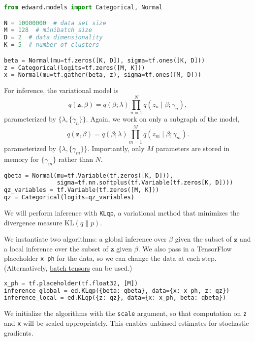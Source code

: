 \begin{lstlisting}[language=Python]
from edward.models import Categorical, Normal

N = 10000000  # data set size
M = 128  # minibatch size
D = 2  # data dimensionality
K = 5  # number of clusters

beta = Normal(mu=tf.zeros([K, D]), sigma=tf.ones([K, D]))
z = Categorical(logits=tf.zeros([M, K]))
x = Normal(mu=tf.gather(beta, z), sigma=tf.ones([M, D]))
\end{lstlisting}

For inference, the variational model is
\begin{equation*}
q(\mathbf{z}, \beta) =
q(\beta; \lambda) \prod_{n=1}^N q(z_n \mid \beta; \gamma_n),
\end{equation*}
parameterized by $\{\lambda, \{\gamma_n\}\}$.
Again, we work on only a subgraph of the model,
\begin{equation*}
q(\mathbf{z}, \beta) =
q(\beta; \lambda) \prod_{m=1}^M q(z_m \mid \beta; \gamma_m).
\end{equation*}
parameterized by $\{\lambda, \{\gamma_m\}\}$. Importantly, only $M$
parameters are stored in memory for $\{\gamma_m\}$ rather than $N$.

\begin{lstlisting}[language=Python]
qbeta = Normal(mu=tf.Variable(tf.zeros([K, D])),
               sigma=tf.nn.softplus(tf.Variable(tf.zeros[K, D])))
qz_variables = tf.Variable(tf.zeros([M, K]))
qz = Categorical(logits=qz_variables)
\end{lstlisting}

We will perform inference with \texttt{KLqp}, a variational method
that minimizes the divergence measure $\text{KL}(q\| p)$.

We instantiate two algorithms: a global inference over $\beta$ given
the subset of $\mathbf{z}$ and a local inference over the subset of
$\mathbf{z}$ given $\beta$.
We also pass in a TensorFlow placeholder \texttt{x_ph} for the data,
so we can change the data at each step. (Alternatively,
\href{/api/data}{batch tensors} can be used.)

\begin{lstlisting}[language=Python]
x_ph = tf.placeholder(tf.float32, [M])
inference_global = ed.KLqp({beta: qbeta}, data={x: x_ph, z: qz})
inference_local = ed.KLqp({z: qz}, data={x: x_ph, beta: qbeta})
\end{lstlisting}

We initialize the algorithms with the \texttt{scale} argument, so that
computation on \texttt{z} and \texttt{x} will be scaled appropriately.
This enables unbiased estimates for stochastic gradients.


